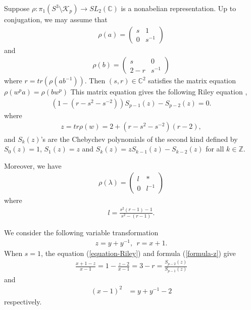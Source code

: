 \documentclass[12pt]{amsart}
\begin{document}
Suppose $\rho: \pi_1(S^3\setminus \mathcal{K}_p)\rightarrow SL_2(\mathbb{C})$ is a nonabelian representation. Up to conjugation, we may assume that 
\begin{align}
    \rho(a)=\begin{pmatrix}
    s & 1 \\
    0  &  s^{-1}
    \end{pmatrix}
\end{align}
and 
\begin{align}
    \rho(b)=\begin{pmatrix}
    s & 0 \\
    2-r  &  s^{-1}
    \end{pmatrix}
\end{align}
where $r=tr(\rho(ab^{-1}))$. Then $(s,r)\in \mathbb{C}^2$ satisfies the matrix equation $\rho(w^pa)=\rho(bw^p)$
This matrix equation gives the following Riley equation \cite{Tr15,Tr16},  
\begin{align} \label{equation-Riley}
    (1-(r-s^2-s^{-2}))S_{p-1}(z)-S_{p-2}(z)=0.
\end{align}
where 
\begin{align}  \label{formula-z}
    z=tr \rho(w)=2+(r-s^2-s^{-2})(r-2),
\end{align}
and $S_{k}(z)$'s  are the Chebychev polynomials of the second kind defined by $S_0(z)=1$, $S_1(z)=z$ and   $S_k(z)=zS_{k-1}(z)-S_{k-2}(z)$ for all $k\in \mathbb{Z}$. 




Moreover, we have 
\begin{align}
    \rho(\lambda)=\begin{pmatrix}
        l & * \\ 
        0 & l^{-1}
    \end{pmatrix}
\end{align}
where 
\begin{align}  \label{formula-l}
    l=\frac{s^2(r-1)-1}{s^2-(r-1)}.
\end{align}

We consider the following variable transformation  
\begin{align} \label{formula-variabletrans}
z=y+y^{-1}, \ \ r=x+1.
\end{align}
When $s=1$, the equation (\ref{equation-Riley}) and formula (\ref{formula-z})  give 
\begin{align} \label{formula-xz}
    \frac{x+1-z}{x-1}=1-\frac{z-2}{x-1}=3-r=\frac{S_{p-2}(z)}{S_{p-1}(z)}
\end{align}
and
\begin{align}
     (x-1)^2&=y+y^{-1}-2
     \end{align}
respectively.
\end{document}
